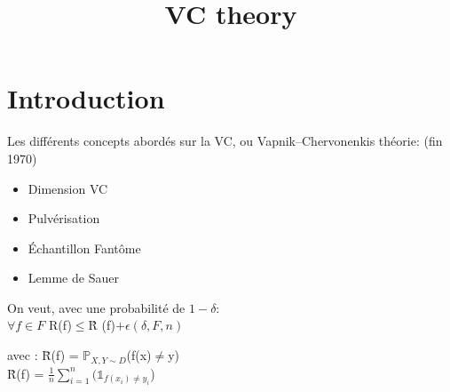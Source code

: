 \documentclass[a4paper]{report}
\title{VC theory}
\begin{document}
\tableofcontents

\renewcommand{\thesection}{\arabic{section}}

\newtheorem{theorem}{Theorem}
\newtheorem{lemma}{Lemme}

\renewcommand{\thetheorem}{\empty{}}
\renewcommand{\thelemma}{\empty{}} 

\newenvironment{proof}[1][Proof]{\begin{trivlist}
\item[\hskip \labelsep {\bfseries #1}]}{\end{trivlist}}
\newenvironment{definition}[1][Definition]{\begin{trivlist}
\item[\hskip \labelsep {\bfseries #1}]}{\end{trivlist}}
\newenvironment{example}[1][Example]{\begin{trivlist}
\item[\hskip \labelsep {\bfseries #1}]}{\end{trivlist}}
\newenvironment{remark}[1][Rq:]{\begin{trivlist}
\item[\hskip \labelsep {\bfseries #1}]}{\end{trivlist}}
\newenvironment{rappel}[1][rappel:]{\begin{trivlist}
\item[\hskip \labelsep {\bfseries #1}]}{\end{trivlist}}


\chapter*{Introduction}
Les différents concepts abordés sur la VC, ou Vapnik–Chervonenkis théorie: (fin 1970)
\begin{itemize}
\item Dimension VC
\item Pulvérisation
\item Échantillon Fantôme
\item Lemme de Sauer
\end{itemize}
On veut, avec une probabilité de $1 - \delta$:\\
$ \forall f \in F $ R(f)$ \leq $\^R (f)$ + \epsilon(\delta, F, n) $\\
\begin{tabbing}
avec : \= R(f) = $\mathds{P}_{X,Y \sim D}$(f(x)$\neq$y)\\
\> \^R(f) = $\frac{1}{n}\displaystyle { \sum_{i=1}^{n}}( \mathds{1}_{f(x_i)\neq y_i} $)\\
\end{tabbing}
\end{document}
